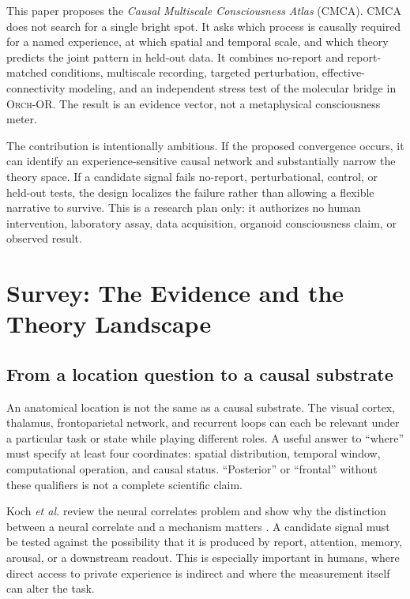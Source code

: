 \documentclass[conference]{IEEEtran}
\newcommand{\CMCA}{\textsc{CMCA}}
\newcommand{\ORCH}{\textsc{Orch-OR}}
\begin{document}
This paper proposes the \emph{Causal Multiscale Consciousness Atlas} (\CMCA). CMCA does not search for a single bright spot. It asks which process is causally required for a named experience, at which spatial and temporal scale, and which theory predicts the joint pattern in held-out data. It combines no-report and report-matched conditions, multiscale recording, targeted perturbation, effective-connectivity modeling, and an independent stress test of the molecular bridge in \ORCH{}. The result is an evidence vector, not a metaphysical consciousness meter.

The contribution is intentionally ambitious. If the proposed convergence occurs, it can identify an experience-sensitive causal network and substantially narrow the theory space. If a candidate signal fails no-report, perturbational, control, or held-out tests, the design localizes the failure rather than allowing a flexible narrative to survive. This is a research plan only: it authorizes no human intervention, laboratory assay, data acquisition, organoid consciousness claim, or observed result.

\section{Survey: The Evidence and the Theory Landscape}

\subsection{From a location question to a causal substrate}

An anatomical location is not the same as a causal substrate. The visual cortex, thalamus, frontoparietal network, and recurrent loops can each be relevant under a particular task or state while playing different roles. A useful answer to ``where'' must specify at least four coordinates: spatial distribution, temporal window, computational operation, and causal status. ``Posterior'' or ``frontal'' without these qualifiers is not a complete scientific claim.

Koch \textit{et al.} review the neural correlates problem and show why the distinction between a neural correlate and a mechanism matters \cite{koch2016}. A candidate signal must be tested against the possibility that it is produced by report, attention, memory, arousal, or a downstream readout. This is especially important in humans, where direct access to private experience is indirect and where the measurement itself can alter the task.
\end{document}
